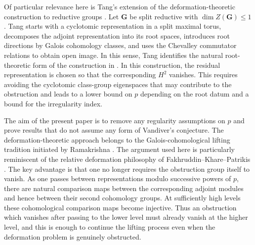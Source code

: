 \documentclass[11pt]{amsart}
\numberwithin{equation}{section}
\newcommand{\GG}{\mathbf G}
\theoremstyle{definition}
\begin{document}
\par Of particular relevance here is Tang's extension of the
deformation-theoretic construction to reductive groups
\cite{Tang2023}. Let $\GG$ be split reductive with
$\dim Z(\GG)\leq1$. Tang starts with a cyclotomic representation in a
split maximal torus, decomposes the adjoint representation into its
root spaces, introduces root directions by Galois cohomology classes,
and uses the Chevalley commutator relations to obtain open image. In
this sense, Tang identifies the natural root-theoretic form of the
construction in \cite{Ray2021}. In this construction, the residual representation is chosen so that
the corresponding $H^2$ vanishes. This requires avoiding the
cyclotomic class-group eigenspaces that may contribute to the
obstruction and leads to a lower bound on $p$ depending on the root
datum and a bound for the irregularity index.

\par The aim of the present paper is to remove any regularity assumptions
on $p$ and prove results that do not assume any form of Vandiver's
conjecture. The deformation-theoretic approach belongs to the
Galois-cohomological lifting tradition initiated by Ramakrishna
\cite{Ramakrishna1999}. The argument used here is particularly reminiscent
of the relative deformation philosophy of
Fakhruddin--Khare--Patrikis \cite{FKP2021}. The key advantage is that
one no longer requires the obstruction group itself to vanish. As one
passes between representations modulo successive powers of $p$, there
are natural comparison maps between the corresponding adjoint modules
and hence between their second cohomology groups. At sufficiently high
levels these cohomological comparison maps become injective. Thus an
obstruction which vanishes after passing to the lower level must
already vanish at the higher level, and this is enough to continue the
lifting process even when the deformation problem is genuinely
obstructed.
\end{document}
